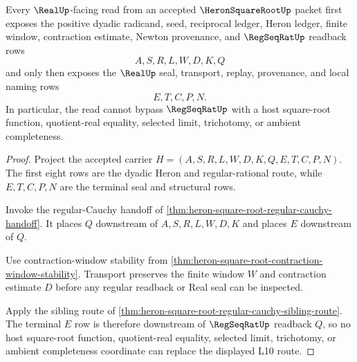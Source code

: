 \begin{theorem}
\label{thm:heron-square-root-real-seal-boundary}
Every $\RealUp$-facing read from an accepted $\HeronSquareRootUp$ packet first exposes the positive dyadic radicand, seed, reciprocal ledger, Heron ledger, finite window, contraction estimate, Newton provenance, and $\RegSeqRatUp$ readback rows
$$
A,S,R,L,W,D,K,Q
$$
and only then exposes the $\RealUp$ seal, transport, replay, provenance, and local naming rows
$$
E,T,C,P,N .
$$
In particular, the read cannot bypass $\RegSeqRatUp$ with a host square-root function, quotient-real equality, selected limit, trichotomy, or ambient completeness.
\end{theorem}
\begin{proof}
Project the accepted carrier $H=(A,S,R,L,W,D,K,Q,E,T,C,P,N)$. The first eight rows are the dyadic Heron and regular-rational route, while $E,T,C,P,N$ are the terminal seal and structural rows.

Invoke the regular-Cauchy handoff of \autoref{thm:heron-square-root-regular-cauchy-handoff}. It places $Q$ downstream of $A,S,R,L,W,D,K$ and places $E$ downstream of $Q$.

Use contraction-window stability from \autoref{thm:heron-square-root-contraction-window-stability}. Transport preserves the finite window $W$ and contraction estimate $D$ before any regular readback or Real seal can be inspected.

Apply the sibling route of \autoref{thm:heron-square-root-regular-cauchy-sibling-route}. The terminal $E$ row is therefore downstream of $\RegSeqRatUp$ readback $Q$, so no host square-root function, quotient-real equality, selected limit, trichotomy, or ambient completeness coordinate can replace the displayed L10 route.
\end{proof}




